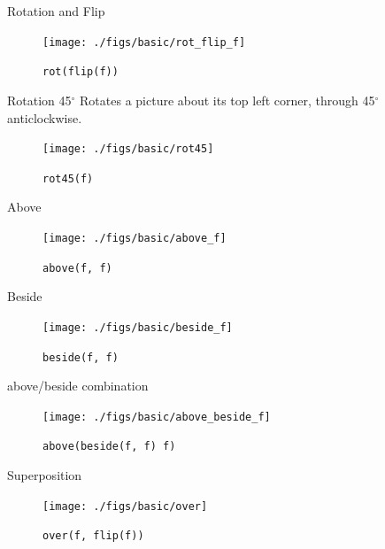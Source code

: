 \documentclass{beamer}
\begin{document}
    \begin{frame}{Rotation and Flip}

        \begin{figure}
            \centering
            \texttt{[image: ./figs/basic/rot\_flip\_f]}
            \caption{\texttt{rot(flip(f))}}
            \label{fig:rot_flip_f}
        \end{figure}
    \end{frame}

    \begin{frame}{Rotation 45$^{\circ}$}
    	Rotates a picture about its top left corner, through 45$^{\circ}$ anticlockwise.

        \begin{figure}
            \centering
            \texttt{[image: ./figs/basic/rot45]}
            \caption{\texttt{rot45(f)}}
            \label{fig:rot45}
        \end{figure}
    \end{frame}

    \begin{frame}{Above}
        \begin{figure}
            \centering
            \texttt{[image: ./figs/basic/above\_f]}
            \caption{\texttt{above(f, f)}}
            \label{fig:above}
        \end{figure}
    \end{frame}

    \begin{frame}{Beside}
        \begin{figure}
            \centering
            \texttt{[image: ./figs/basic/beside\_f]}
            \caption{\texttt{beside(f, f)}}
            \label{fig:beside}
        \end{figure}
    \end{frame}

    \begin{frame}{above/beside combination}
        \begin{figure}
            \centering
            \texttt{[image: ./figs/basic/above\_beside\_f]}
            \caption{\texttt{above(beside(f, f) f)}}
            \label{fig:above_beside_f}
        \end{figure}
    \end{frame}

    \begin{frame}{Superposition}
        \begin{figure}
            \centering
            \texttt{[image: ./figs/basic/over]}
            \caption{\texttt{over(f, flip(f))}}
            \label{fig:over_f}
        \end{figure}
    \end{frame}
\end{document}
